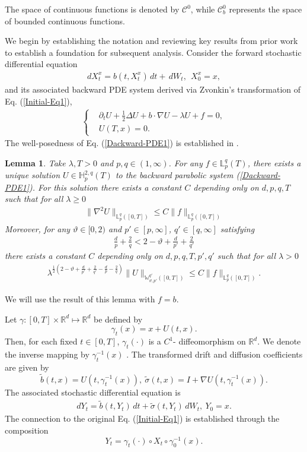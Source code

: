 \documentclass[12pt,oneside, reqno]{amsart}
\newcommand{\be}{\begin{eqnarray}}
\newcommand{\ee}{\end{eqnarray}}
\newcommand{\ce}{\begin{eqnarray*}}
\newcommand{\de}{\end{eqnarray*}}
\newtheorem{lemma}[theorem]{Lemma}
\def\mH{{\mathbb H}}
\def\mL{{\mathbb L}}
\def\mR{{\mathbb R}}
\def\mW{{\mathbb W}}
\def\sC{{\mathscr C}}
\def\geq{\geqslant}
\def\leq{\leqslant}
\numberwithin{equation}{section}
\begin{document}
The space of continuous functions is denoted by $\sC^0$, while $\sC_b^0$  represents the space of bounded continuous functions.

 


We begin by establishing the notation and reviewing key results from prior work to establish a foundation for subsequent analysis. Consider the forward stochastic differential equation
\be\label{Initial-Eq1} 
dX_t^x=b(t,X_t^x)\,dt+\,dW_t,~~X_0^x=x,
\ee 
and its associated backward PDE system derived via Zvonkin's transformation of  Eq. (\ref{Initial-Eq1}), 
\be\label{Dackward-PDE1}
\left\{
\begin{split}
	&\partial_t U+\frac{1}{2}\Delta U+b\cdot \nabla U-\lambda U+f=0,\\
	&U(T,x)=0.
\end{split}
	\right.
\ee 
The well-posedness of Eq. (\ref{Dackward-PDE1}) is established in \cite[Lemma 4.2]{XieZhang2020}.
\begin{lemma}\label{SPDE-solution-esta1}
Take $\lambda, T>0$ and $p,q\in (1,\infty)$. For any $f\in \mL_p^q(T)$, there exists a unique solution $U\in \mH_p^{2,q}(T)$ to the backward parabolic system (\ref{Dackward-PDE1}). For this solution there exists a constant $C$ depending only on $d,p,q,T$ such that  for all $\lambda\geq 0$
\ce 
\|\nabla^2 U\|_{\mL_p^{q}([0,T])}\leq C\|f\|_{\mL_p^q([0,T])}
\de 
Moreover, for any $\vartheta\in[0,2)$ and $p'\in [p,\infty]$, $q'\in [q,\infty]$ satisfying 
\ce 
\frac{d}{p}+\frac{2}{q}<2-\vartheta+\frac{d}{p'}+\frac{2}{q'}
\de 
there exists a constant $C$ depending only on $d,p,q,T, p',q'$ such that  for all $\lambda>0$
\be \label{gridentU-est1}
\lambda^{\frac{1}{2}(2-\vartheta+\frac{d}{p'}+\frac{2}{q'}-\frac{d}{p}-\frac{2}{q})}
\|U\|_{\mW^{q'}_{\vartheta,p'}([0,T])}\leq  C\|f\|_{\mL_p^q([0,T])}.
\ee 
\end{lemma}

We will use the result of this lemma with $f=b$. 

Let $\gamma:[0,T]\times \mR^d\mapsto \mR^d$ be defined by 
$$\gamma_t(x)=x+U(t,x).$$
Then, for each fixed $t\in[0,T]$, $\gamma_t(\cdot)$ is a $C^1$- diffeomorphism on $\mR^d$. 
We denote the inverse mapping by  $\gamma_t^{-1}(x)$ . The transformed drift and diffusion coefficients are given by
$$\tilde{b}(t,x)=U(t, \gamma_t^{-1}(x)),~\tilde{\sigma}(t,x)=I+\nabla U(t, \gamma_t^{-1}(x)).$$
The associated stochastic differential equation  is
\be\label{auxiliarySDE1} 
dY_t=\tilde{b}(t,Y_t)\,dt+\tilde{\sigma}(t,Y_t) \,dW_t,~Y_0=x.
\ee 
The connection to the original Eq. (\ref{Initial-Eq1}) is established through the composition
$$
Y_t=\gamma_t(\cdot)\circ X_t \circ \gamma_0^{-1}(x).
$$
\end{document}
